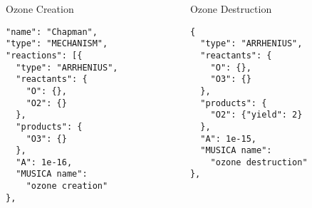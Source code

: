 \begin{columns}
\begin{column}{0.47\textwidth}
\vspace{-0.33in}
\begin{block}{Ozone Creation}
\begin{verbatim}
"name": "Chapman",
"type": "MECHANISM",
"reactions": [{
  "type": "ARRHENIUS",
  "reactants": {
    "O": {},
    "O2": {}
  },
  "products": {
    "O3": {}
  },
  "A": 1e-16,
  "MUSICA name":
    "ozone creation"
},
\end{verbatim}
\end{block}
\end{column}
\begin{column}{0.47\textwidth}
\vspace{0.04in}
\begin{block}{Ozone Destruction}
\begin{verbatim}
{
  "type": "ARRHENIUS",
  "reactants": {
    "O": {},
    "O3": {}
  },
  "products": {
    "O2": {"yield": 2}
  },
  "A": 1e-15,
  "MUSICA name":
    "ozone destruction"
},
\end{verbatim}
\end{block}
\end{column}
\end{columns}
